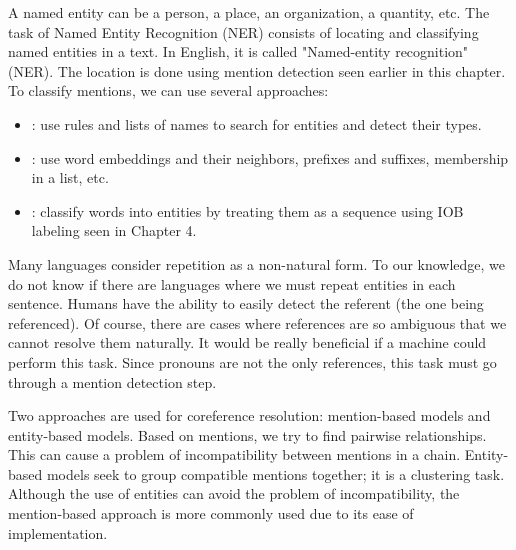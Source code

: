 \documentclass{KBook}
\begin{document}
A named entity can be a person, a place, an organization, a quantity, etc. The task of Named Entity Recognition (NER) consists of locating and classifying named entities in a text. In English, it is called "Named-entity recognition" (NER). The location is done using mention detection seen earlier in this chapter. To classify mentions, we can use several approaches:
\begin{itemize}
	\item {}: use rules and lists of names to search for entities and detect their types.
	\item {}: use word embeddings and their neighbors, prefixes and suffixes, membership in a list, etc.
	\item {}: classify words into entities by treating them as a sequence using IOB labeling seen in Chapter 4.
	
\end{itemize}



Many languages consider repetition as a non-natural form. To our knowledge, we do not know if there are languages where we must repeat entities in each sentence. Humans have the ability to easily detect the referent (the one being referenced). Of course, there are cases where references are so ambiguous that we cannot resolve them naturally. It would be really beneficial if a machine could perform this task. Since pronouns are not the only references, this task must go through a mention detection step.

Two approaches are used for coreference resolution: mention-based models and entity-based models. Based on mentions, we try to find pairwise relationships. This can cause a problem of incompatibility between mentions in a chain. Entity-based models seek to group compatible mentions together; it is a clustering task. Although the use of entities can avoid the problem of incompatibility, the mention-based approach is more commonly used due to its ease of implementation.
\end{document}
